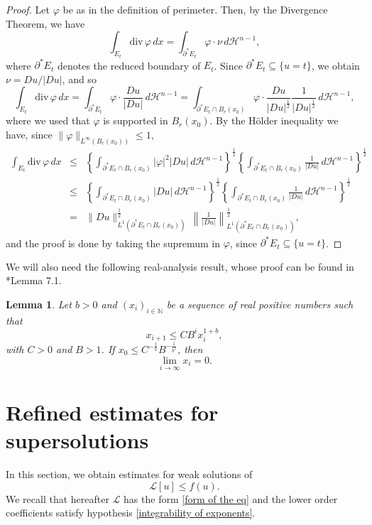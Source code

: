 \documentclass[12pt,a4paper]{amsart}
\numberwithin{equation}{section} %
\newtheorem{lemma}[theorem]{Lemma}
\theoremstyle{definition}
\theoremstyle{remark}
\begin{document}
\begin{proof}
Let $\varphi$ be as in the definition of perimeter. Then, by the Divergence Theorem, we have
$$
    \int_{E_t} \mbox{div}\, \varphi\,dx = \int_{\partial^* E_t} \varphi \cdot \nu\, d\mathcal{H}^{n-1},
$$
where $\partial^* E_t$ denotes the reduced boundary of $E_t$. Since $\partial^* E_t \subseteq \{u=t\}$, we obtain $\nu = Du/|Du|$, and so
$$
    \int_{E_t} \mbox{div}\, \varphi \,dx = \int_{\partial^* E_t} \varphi \cdot \frac{Du}{|Du|}\, d\mathcal{H}^{n-1} = \int_{\partial^* E_t \cap B_r(x_0)} \varphi \cdot \frac{Du}{|Du|^{\frac{1}{2}}} \frac{1}{|Du|^{\frac{1}{2}}}\, d\mathcal{H}^{n-1},
$$
where we used that $\varphi$ is supported in $B_r(x_0)$. By the H\"older inequality we have, since  $\|\varphi\|_{L^\infty(B_r(x_0))} \leq 1$,
\begin{eqnarray*}
    \int_{E_t} \mbox{div}\, \varphi \, dx & \leq & \left\{\int_{\partial^* E_t \cap B_r(x_0)}|\varphi|^2 |Du| \, d\mathcal{H}^{n-1} \right\}^{\frac{1}{2}} \left\{\int_{\partial^* E_t \cap B_r(x_0)} \frac{1}{|Du|}\, d\mathcal{H}^{n-1}\right\}^{\frac{1}{2}}\\
    & \leq & \left\{\int_{\partial^* E_t \cap B_r(x_0)} |Du| \, d\mathcal{H}^{n-1}\right\}^{\frac{1}{2}} \left\{\int_{\partial^* E_t \cap B_r(x_0)} \frac{1}{|Du|}\, d\mathcal{H}^{n-1}\right\}^{\frac{1}{2}}\\
    & = & \|Du\|_{L^1(\partial^* E_t \cap B_r(x_0))}^{\frac{1}{2}}\, \left\|\frac{1}{|Du|} \right\|_{L^1(\partial^* E_t \cap B_r(x_0))}^\frac{1}{2},
\end{eqnarray*}
and the proof is done by taking the supremum in $\varphi$, since $\partial^* E_t \subseteq \{u=t\}$.
\end{proof}

We will also need the following real-analysis result, whose proof can be found in \cite{EG}*{Lemma 7.1}.
\begin{lemma}\label{useful real analysis result}
Let $b>0$ and $(x_i)_{i \in \mathbb{N}}$ be a sequence of real positive numbers such that
$$
    x_{i+1} \leq CB^ix_i^{1+b},
$$
with $C>0$ and $B>1$. If $x_0 \leq C^{-\frac{1}{b}}B^{-\frac{1}{b^2}}$, then 
$$
    \lim_{i \to \infty}x_i = 0.
$$
\end{lemma}

\section{Refined estimates for supersolutions}\label{supersolution-sct}
In this section, we obtain estimates for weak solutions of
$$
    \mathcal{L}[u] \leq f(u).
$$
We recall that hereafter $\mathcal{L}$ has the form \eqref{form of the eq} and the lower order coefficients satisfy hypothesis \eqref{integrability of exponents}.
\end{document}
